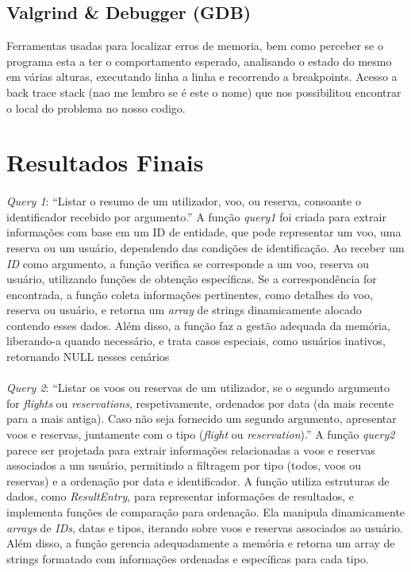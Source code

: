 \documentclass{article}
\begin{document}
\subsection{Valgrind & Debugger (GDB)}
Ferramentas usadas para localizar erros de memoria, bem como perceber se o programa esta a ter o comportamento esperado, analisando o estado do mesmo em várias alturas, executando linha a linha e recorrendo a breakpoints. Acesso a back trace stack (nao me lembro se é este o nome) que nos possibilitou encontrar o local do problema no nosso codigo.

\section{Resultados Finais}
\paragraph{}\textit{Query 1}: “Listar o resumo de um utilizador, voo, ou reserva, consoante o identificador recebido por argumento.”
A função \textit{query1} foi criada para extrair informações com base em um ID de entidade, que pode representar um voo, uma reserva ou um usuário, dependendo das condições de identificação. Ao receber um \textit{ID} como argumento, a função verifica se corresponde a um voo, reserva ou usuário, utilizando funções de obtenção específicas. Se a correspondência for encontrada, a função coleta informações pertinentes, como detalhes do voo, reserva ou usuário, e retorna um \textit{array} de strings dinamicamente alocado contendo esses dados. Além disso, a função faz a gestão adequada da memória, liberando-a quando necessário, e trata casos especiais, como usuários inativos, retornando NULL nesses cenários
\paragraph{}\textit{Query 2}: “Listar os voos ou reservas de um utilizador, se o segundo argumento for \textit{flights} ou \textit{reservations}, respetivamente, ordenados por data (da mais recente para a mais antiga). Caso não seja fornecido um segundo argumento, apresentar voos e reservas, juntamente com o tipo (\textit{flight} ou \textit{reservation}).”
A função \textit{query2} parece ser projetada para extrair informações relacionadas a voos e reservas associados a um usuário, permitindo a filtragem por tipo (todos, voos ou reservas) e a ordenação por data e identificador. A função utiliza estruturas de dados, como \textit{ResultEntry}, para representar informações de resultados, e implementa funções de comparação para ordenação. Ela manipula dinamicamente \textit{arrays} de \textit{IDs}, datas e tipos, iterando sobre voos e reservas associados ao usuário. Além disso, a função gerencia adequadamente a memória e retorna um array de strings formatado com informações ordenadas e específicas para cada tipo.
\end{document}
